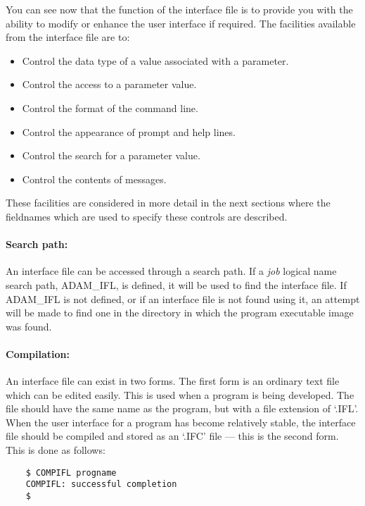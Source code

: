 You can see now that the function of the interface file is to provide you with
the ability to modify or enhance the user interface if required.
The facilities available from the interface file are to:
\begin{itemize}
\item Control the data type of a value associated with a parameter.
\item Control the access to a parameter value.
\item Control the format of the command line.
\item Control the appearance of prompt and help lines.
\item Control the search for a parameter value.
\item Control the contents of messages.
\end{itemize}
These facilities are considered in more detail in the next sections where the
fieldnames which are used to specify these controls are described.

\paragraph{Search path:}\hfill

An interface file can be accessed through a search path.
If a {\em job} logical name search path, ADAM\_IFL, is defined, it will be used
to find the interface file.
If ADAM\_IFL is not defined, or if an interface file is not found using it, an
attempt will be made to find one in the directory in which the program
executable image was found.

\paragraph{Compilation:}\hfill

An interface file can exist in two forms.
The first form is an ordinary text file which can be edited easily.
This is used when a program is being developed.
The file should have the same name as the program, but with a file extension of
`.IFL'.
When the user interface for a program has become relatively stable, the
interface file should be compiled and stored as an `.IFC' file --- this is the
second form.
This is done as follows:

\begin{small}
\begin{verbatim}
    $ COMPIFL progname
    COMPIFL: successful completion
    $
\end{verbatim}
\end{small}

